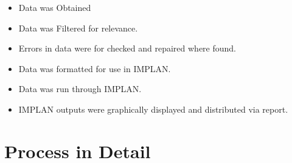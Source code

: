 \documentclass[
]{book}
\providecommand{\tightlist}{%
  \setlength{\itemsep}{0pt}\setlength{\parskip}{0pt}}
\begin{document}
\begin{itemize}
\tightlist
\item
  Data was Obtained
\item
  Data was Filtered for relevance.
\item
  Errors in data were for checked and repaired where found.
\item
  Data was formatted for use in IMPLAN.
\item
  Data was run through IMPLAN.
\item
  IMPLAN outputs were graphically displayed and distributed via report.
\end{itemize}

\hypertarget{process-in-detail}{%
\section{Process in Detail}\label{process-in-detail}}
\end{document}
